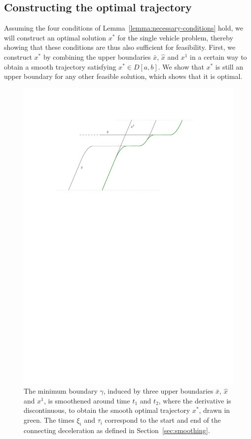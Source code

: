 \documentclass[a4paper]{article}
\theoremstyle{definition}
\theoremstyle{plain}
\begin{document}
\subsection{Constructing the optimal trajectory}

Assuming the four conditions of Lemma~\ref{lemma:necessary-conditions} hold, we will construct an optimal
solution $x^{*}$ for the single vehicle problem, thereby showing that these
conditions are thus also sufficient for feasibility.
%
First, we construct $x^{*}$ by combining the upper boundaries $\bar{x}$,
$\hat{x}$ and $x^{1}$ in a certain way to obtain a smooth trajectory satisfying
$x^{*} \in D[a,b]$.
%
We show that $x^{*}$ is still an upper boundary for any other feasible solution,
which shows that it is optimal.

\begin{figure}
  \centering
  \includegraphics[scale=1]{figures/motion/rough/proof}
  \caption{The minimum boundary $\gamma$, induced by three upper boundaries
    $\bar{x}$, $\hat{x}$ and $x^{1}$, is smoothened around time $t_{1}$ and
    $t_{2}$, where the derivative is discontinuous, to obtain the smooth optimal
    trajectory $x^{*}$, drawn in green. The times $\xi_{i}$ and $\tau_{i}$
    correspond to the start and end of the connecting deceleration as
    defined in Section~\ref{sec:smoothing}.}%
  \label{fig:optimal-construction}
\end{figure}
\end{document}
